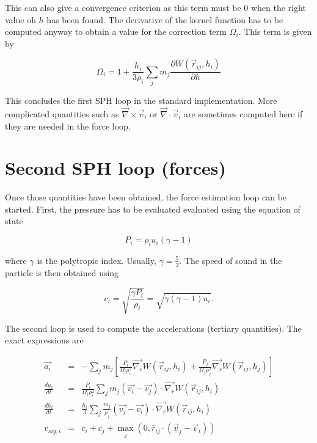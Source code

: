 \documentclass[a4paper,10pt]{article}
\begin{document}
This can also give a convergence criterion as this term must be $0$ when the right value oh $h$ has been found.
The derivative of the kernel function has to be computed anyway to obtain a value for the correction term $\Omega_i$.
This term is given by

\begin{equation}
  \Omega_i = 1 + \frac{h_i}{3\rho_i}\sum_j m_j\frac{\partial W(\vec{r}_{ij},h_i)}{\partial h}
\end{equation}

This concludes the first SPH loop in the standard implementation. More complicated quantities such as
$\vec\nabla\times\vec v_i$ or $\vec\nabla\cdot\vec v_i$ are sometimes computed here if they are needed in the force
loop.

\section{Second SPH loop (forces)}
\label{sec:forces}

Once those quantities have been obtained, the force estimation loop can be started.
First, the pressure has to be evaluated evaluated using the equation of state

\begin{equation}
\label{eq:pressure}
 P_i = \rho_i u_i (\gamma - 1)
\end{equation}

where $\gamma$ is the polytropic index. Usually, $\gamma = \frac{5}{3}$. The speed of sound in the particle is then
obtained using

\begin{equation}
 c_i = \sqrt{\frac{\gamma P_i}{\rho_i}} = \sqrt{\gamma (\gamma-1)u_i}.
\end{equation}

The second loop is used to compute the accelerations (tertiary quantities). The exact expressions are

\begin{eqnarray}
 \vec{a_i} &=& - \sum_j m_j\left[\frac{P_i}{\Omega_i\rho_i^2}\vec{\nabla_r} W(\vec{r}_{ij}, h_i) +
\frac{P_j}{\Omega_j\rho_j^2}\vec{\nabla_r}W(\vec{r}_{ij}, h_j) \right] \label{eq:acceleration}\\
 \frac{du_i}{dt} &=& \frac{P_i}{\Omega_i\rho_i^2} \sum_j m_j
(\vec{v_i}-\vec{v_j})\cdot\vec{\nabla_r} W(\vec{r}_{ij}, h_i)
\label{eq:dudt}\\
 \frac{dh_i}{dt} &=& \frac{h_i}{3}\sum_j \frac{m_j}{\rho_j} \left(\vec{v_j} - \vec{v_i} \right)
\cdot\vec{\nabla_r}W(\vec{r}_{ij}, h_i)\\
 v_{sig,i} &=& c_i + c_j + \max_j(0, \hat{r}_{ij} \cdot (\vec{v}_j - \vec{v}_i))
\end{eqnarray}
\end{document}
